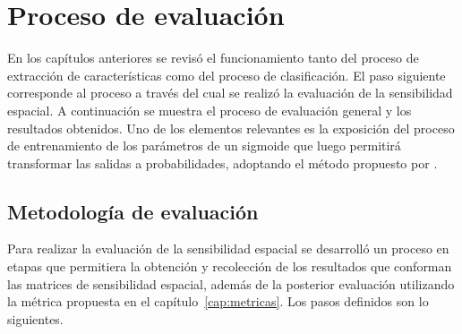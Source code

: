
\chapter{Proceso de evaluación}
\label{cap:eval}

En los capítulos anteriores se revisó el funcionamiento tanto del proceso de extracción de características como del proceso de clasificación. El paso siguiente corresponde al proceso a través del cual se realizó la evaluación de la sensibilidad espacial. A continuación se muestra el proceso de evaluación general y los resultados obtenidos. Uno de los elementos relevantes es la exposición del proceso de entrenamiento de los parámetros de un sigmoide que luego permitirá transformar las salidas a probabilidades, adoptando el método propuesto por \cite{Platt1999}.

\section{Metodología de evaluación}
\label{eval:metodologia}

Para realizar la evaluación de la sensibilidad espacial se desarrolló un proceso en etapas que permitiera la obtención y recolección de los resultados que conforman las matrices de sensibilidad espacial, además de la posterior evaluación utilizando la métrica propuesta en el capítulo~\ref{cap:metricas}. Los  pasos definidos son lo siguientes.

